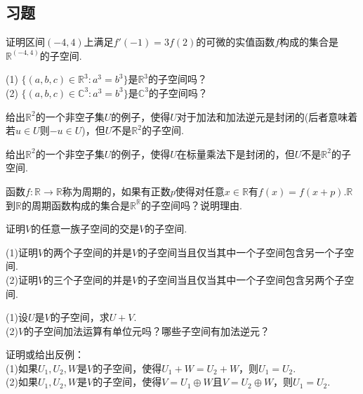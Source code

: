 \documentclass[lang=cn, zihao=5]{elegantbook}
\newcommand{\R}{\mathbb{R}}
\newcommand{\C}{\mathbb{C}}
\begin{document}
\subsection*{习题}

\begin{exercise}
	证明区间$(-4,4)$上满足$f'(-1)=3f(2)$的可微的实值函数$f$构成的集合是$\R ^{(-4,4)}$的子空间.
\end{exercise}

\begin{exercise}
	(1) $\{ (a,b,c) \in \R ^{3} : a^3 = b^3 \}$是$\R ^{3}$的子空间吗？ \\
	(2) $\{ (a,b,c) \in \C ^{3} : a^3 = b^3 \}$是$\C ^{3}$的子空间吗？
\end{exercise}

\begin{exercise}
	给出$\R ^2$的一个非空子集$U$的例子，使得$U$对于加法和加法逆元是封闭的(后者意味着若$u \in U$则$-u \in U$)，但$U$不是$\R ^2$的子空间.
\end{exercise}

\begin{exercise}
	给出$\R ^2$的一个非空子集$U$的例子，使得$U$在标量乘法下是封闭的，但$U$不是$\R ^2$的子空间.
\end{exercise}

\begin{exercise}
	函数$f : \R \to \R$称为周期的，如果有正数$p$使得对任意$x \in \R$有$f(x)=f(x+p)$.$\R$到$\R$的周期函数构成的集合是$\R ^{\R}$的子空间吗？说明理由.
\end{exercise}

\begin{exercise}
	证明$V$的任意一族子空间的交是$V$的子空间.
\end{exercise}

\begin{exercise}
	(1)证明$V$的两个子空间的并是$V$的子空间当且仅当其中一个子空间包含另一个子空间. \\
	(2)证明$V$的三个子空间的并是$V$的子空间当且仅当其中一个子空间包含另两个子空间.
\end{exercise}

\begin{exercise}
	(1)设$U$是$V$的子空间，求$U+V$. \\
	(2)$V$的子空间加法运算有单位元吗？哪些子空间有加法逆元？
\end{exercise}

\begin{exercise}
	证明或给出反例： \\
	(1)如果$U_1,U_2,W$是$V$的子空间，使得$U_1+W=U_2+W$，则$U_1=U_2$. \\
	(2)如果$U_1,U_2,W$是$V$的子空间，使得$V=U_1 \oplus W$且$V=U_2 \oplus W$，则$U_1=U_2$.
\end{exercise}
\end{document}

